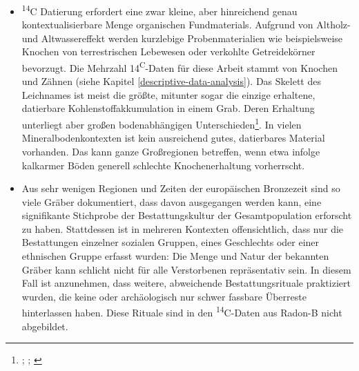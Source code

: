 \documentclass[openany,twoside,twocolumn]{book}
\let\rmarkdownfootnote\footnote%
\def\footnote{\protect\rmarkdownfootnote}
\begin{document}
\begin{itemize}
\item
  \textsuperscript{14}C Datierung erfordert eine zwar kleine, aber
  hinreichend genau kontextualisierbare Menge organischen Fundmaterials.
  Aufgrund von Altholz- und Altwassereffekt werden kurzlebige
  Probenmaterialien wie beispielsweise Knochen von terrestrischen
  Lebewesen oder verkohlte Getreidekörner bevorzugt. Die Mehrzahl
  14\textsuperscript{C}-Daten für diese Arbeit stammt von Knochen und
  Zähnen (siehe Kapitel \ref{descriptive-data-analysis}). Das Skelett
  des Leichnames ist meist die größte, mitunter sogar die einzige
  erhaltene, datierbare Kohlenstoffakkumulation in einem Grab. Deren
  Erhaltung unterliegt aber großen bodenabhängigen
  Unterschieden\footnote{\textcite{brock_pre-screening_2010};
    \textcite{gordon_soil_1981}; \textcite{nielsen-marsh_bone_2007}}. In
  vielen Mineralbodenkontexten ist kein ausreichend gutes, datierbares
  Material vorhanden. Das kann ganze Großregionen betreffen, wenn etwa
  infolge kalkarmer Böden generell schlechte Knochenerhaltung
  vorherrscht.
\item
  Aus sehr wenigen Regionen und Zeiten der europäischen Bronzezeit sind
  so viele Gräber dokumentiert, dass davon ausgegangen werden kann, eine
  signifikante Stichprobe der Bestattungskultur der Gesamtpopulation
  erforscht zu haben. Stattdessen ist in mehreren Kontexten
  offensichtlich, dass nur die Bestattungen einzelner sozialen Gruppen,
  eines Geschlechts oder einer ethnischen Gruppe erfasst wurden: Die
  Menge und Natur der bekannten Gräber kann schlicht nicht für alle
  Verstorbenen repräsentativ sein. In diesem Fall ist anzunehmen, dass
  weitere, abweichende Bestattungsrituale praktiziert wurden, die keine
  oder archäologisch nur schwer fassbare Überreste hinterlassen haben.
  Diese Rituale sind in den \textsuperscript{14}C-Daten aus Radon-B
  nicht abgebildet.
\end{itemize}
\end{document}
